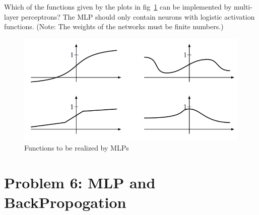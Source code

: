 \documentclass[12pt]{article}
\begin{document}
Which of the functions given by the plots in fig~\ref{fig:mlp3} can be implemented by multi-layer
perceptrons? The MLP should only contain neurons with logistic activation functions.
(Note: The weights of the networks must be finite numbers.)

\begin{figure}
	\centering

	\includegraphics[width=.75\textwidth]{fig/2018-03-19-13-57-32.png}
	\caption{Functions to be realized by MLPs} \label{fig:mlp3}
\end{figure}


\section{Problem 6: MLP and BackPropogation} \label{sec:3}
\end{document}
